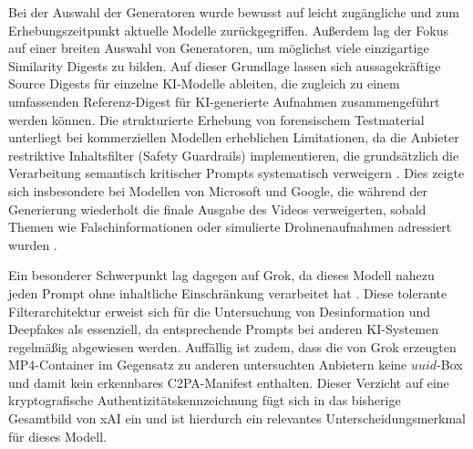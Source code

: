 Bei der Auswahl der Generatoren wurde bewusst auf leicht zugängliche und zum Erhebungszeitpunkt aktuelle Modelle zurückgegriffen. Außerdem lag der Fokus auf einer breiten Auswahl von Generatoren, um möglichst viele einzigartige Similarity Digests zu bilden. Auf dieser Grundlage lassen sich aussagekräftige Source Digests für einzelne KI-Modelle ableiten, die zugleich zu einem umfassenden Referenz-Digest für KI-generierte Aufnahmen zusammengeführt werden können. Die strukturierte Erhebung von forensischem Testmaterial unterliegt bei kommerziellen Modellen erheblichen Limitationen, da die Anbieter restriktive Inhaltsfilter (Safety Guardrails) implementieren, die grundsätzlich die Verarbeitung semantisch kritischer Prompts systematisch verweigern \cite{openai_safety_2025}. Dies zeigte sich insbesondere bei Modellen von Microsoft und Google, die während der Generierung wiederholt die finale Ausgabe des Videos verweigerten, sobald Themen wie Falschinformationen oder simulierte Drohnenaufnahmen adressiert wurden \cite{google_gemini_2023}.

Ein besonderer Schwerpunkt lag dagegen auf Grok, da dieses Modell nahezu jeden Prompt ohne inhaltliche Einschränkung verarbeitet hat \cite{xai_grok_2025}. Diese tolerante Filterarchitektur erweist sich für die Untersuchung von Desinformation und Deepfakes als essenziell, da entsprechende Prompts bei anderen KI-Systemen regelmäßig abgewiesen werden. Auffällig ist zudem, dass die von Grok erzeugten MP4-Container im Gegensatz zu anderen untersuchten Anbietern keine \(uuid\)-Box und damit kein erkennbares C2PA-Manifest enthalten. Dieser Verzicht auf eine kryptografische Authentizitätskennzeichnung fügt sich in das bisherige Gesamtbild von xAI ein und ist hierdurch ein relevantes Unterscheidungsmerkmal für dieses Modell.